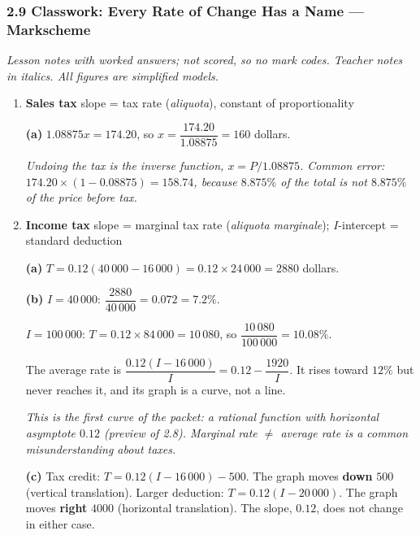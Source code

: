 \documentclass[12pt, twoside]{article}
\newcommand{\ita}[1]{(\emph{#1})}
\begin{document}
\subsubsection*{2.9 Classwork: Every Rate of Change Has a Name --- Markscheme}

\emph{Lesson notes with worked answers; not scored, so no mark codes. Teacher
notes in italics. All figures are simplified models.}

\begin{enumerate}[itemsep=0.3cm]

\item[1.] \textbf{Sales tax} \quad slope = tax rate \ita{aliquota},
constant of proportionality

\textbf{(a)} $1.08875x = 174.20$, so $x = \dfrac{174.20}{1.08875} = 160$
dollars.

\emph{Undoing the tax is the inverse function, $x = P / 1.08875$. Common
error: $174.20 \times (1 - 0.08875) = 158.74$, because $8.875\%$ of the total
is not $8.875\%$ of the price before tax.}

\item[2.] \textbf{Income tax} \quad slope = marginal tax rate
\ita{aliquota marginale}; $I$-intercept = standard deduction

\textbf{(a)} $T = 0.12(40\,000 - 16\,000) = 0.12 \times 24\,000 = 2880$
dollars.

\textbf{(b)} $I = 40\,000$: $\dfrac{2880}{40\,000} = 0.072 = 7.2\%$.

$I = 100\,000$: $T = 0.12 \times 84\,000 = 10\,080$, so
$\dfrac{10\,080}{100\,000} = 10.08\%$.

The average rate is $\dfrac{0.12(I - 16\,000)}{I} = 0.12 -
\dfrac{1920}{I}$. It rises toward $12\%$ but never reaches it, and its graph
is a curve, not a line.

\emph{This is the first curve of the packet: a rational function with
horizontal asymptote $0.12$ (preview of 2.8). Marginal rate $\ne$ average
rate is a common misunderstanding about taxes.}

\textbf{(c)} Tax credit: $T = 0.12(I - 16\,000) - 500$. The graph moves
\textbf{down} $500$ (vertical translation). Larger deduction:
$T = 0.12(I - 20\,000)$. The graph moves \textbf{right} $4000$ (horizontal
translation). The slope, $0.12$, does not change in either case.


\end{enumerate}
\end{document}
